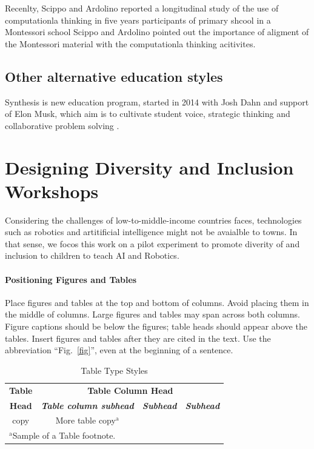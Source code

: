 \documentclass[conference]{IEEEtran}
\begin{document}
Recenlty, Scippo and Ardolino reported a longitudinal study of the use of computationla thinking in five years participants of primary shcool in a Montessori school \cite{ScippoArdolino2021}
Scippo and Ardolino pointed out the importance of aligment of the Montessori material with the computationla thinking acitivites. 

\subsection{Other alternative education styles}
Synthesis is new education program, started in 2014 with Josh Dahn and support of Elon Musk, which aim is to cultivate student voice, strategic thinking and collaborative problem solving \cite{synthesis2022}.


\section{Designing Diversity and Inclusion  Workshops}
Considering the challenges of low-to-middle-income countries faces, technologies such as robotics and artitificial intelligence might not be avaialble to towns. 
In that sense, we focos this work on a pilot experiment to promote diverity of and inclusion to children to teach AI and Robotics. 

\paragraph{Positioning Figures and Tables} Place figures and tables at the top and 
bottom of columns. Avoid placing them in the middle of columns. Large 
figures and tables may span across both columns. Figure captions should be 
below the figures; table heads should appear above the tables. Insert 
figures and tables after they are cited in the text. Use the abbreviation 
``Fig.~\ref{fig}'', even at the beginning of a sentence.

\begin{table}[htbp]
\caption{Table Type Styles}
\begin{center}
\begin{tabular}{|c|c|c|c|}
\hline
\textbf{Table}&\multicolumn{3}{|c|}{\textbf{Table Column Head}} \\
\cline{2-4} 
\textbf{Head} & \textbf{\textit{Table column subhead}}& \textbf{\textit{Subhead}}& \textbf{\textit{Subhead}} \\
\hline
copy& More table copy$^{\mathrm{a}}$& &  \\
\hline
\multicolumn{4}{l}{$^{\mathrm{a}}$Sample of a Table footnote.}
\end{tabular}
\label{tab1}
\end{center}
\end{table}
\end{document}
